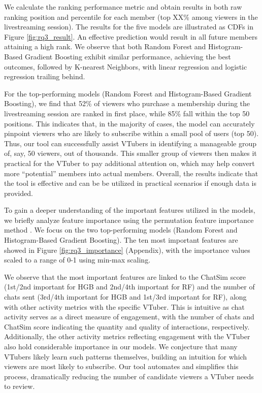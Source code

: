 We calculate the ranking performance metric and obtain results in both raw ranking position and percentile for each member (\ie top XX\% among viewers in the livestreaming session). 
The results for the five models are illustrated as CDFs in Figure \ref{fig:rq3_result}. An effective prediction would result in all future members attaining a high rank. We observe that both Random Forest and Histogram-Based Gradient Boosting exhibit similar performance, achieving the best outcomes, followed by K-nearest Neighbors, with linear regression and logistic regression trailing behind.

For the top-performing models (Random Forest and Histogram-Based Gradient Boosting), we find that 52\% of viewers who purchase a membership during the livestreaming session are ranked in first place, while 85\% fall within the top 50 positions. This indicates that, in the majority of cases, the model can accurately pinpoint viewers who are likely to subscribe within a small pool of users (top 50).
Thus, our tool can successfully assist VTubers in identifying a manageable group of, say, 50 viewers, out of thousands. This smaller group of viewers then makes it practical for the VTuber to pay additional attention on, which may help convert more ``potential'' members into actual members. Overall, the results indicate that the tool is effective and can be be utilized in practical scenarios if enough data is provided.


To gain a deeper understanding of the important features utilized in the models, we briefly analyze feature importance using the permutation feature importance method \cite{breiman_permutation_2001}. We focus on the two top-performing models (Random Forest and Histogram-Based Gradient Boosting). The ten most important features are showed in Figure \ref{fig:rq3_importance} (Appendix), with the importance values scaled to a range of 0-1 using min-max scaling.

We observe that the most important features are linked to the ChatSim score (1st/2nd important for HGB and 2nd/4th important for RF) and the number of chats sent (3rd/4th important for HGB and 1st/3rd important for RF), along with other activity metrics with the specific VTuber. This is intuitive as chat activity serves as a direct measure of engagement, with the number of chats and ChatSim score indicating the quantity and quality of interactions, respectively. Additionally, the other activity metrics reflecting engagement with the VTuber also hold considerable importance in our models. We conjecture that many VTubers likely learn such patterns themselves, building an intuition for which viewers are most likely to subscribe. Our tool automates and simplifies this process, dramatically reducing the number of candidate viewers a VTuber needs to review.


